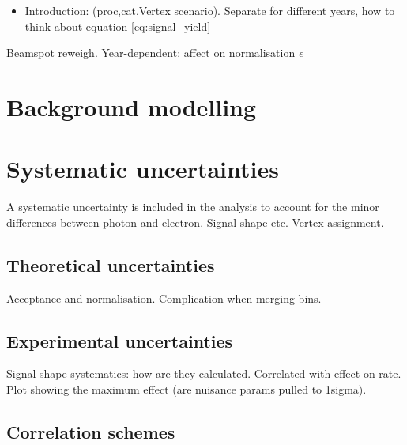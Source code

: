 \begin{itemize}
    \item Introduction: (proc,cat,Vertex scenario). Separate for different years, how to think about equation \ref{eq:signal_yield}
\end{itemize}


Beamspot reweigh. Year-dependent: affect on normalisation $\epsilon$

\section{Background modelling}\label{sec:bkg_modeling}

\section{Systematic uncertainties}\label{sec:systematics}
A systematic uncertainty is included in the analysis to account for the minor differences between photon and electron. Signal shape etc. Vertex assignment.
\subsection{Theoretical uncertainties}
Acceptance and normalisation. Complication when merging bins.

\subsection{Experimental uncertainties}
Signal shape systematics: how are they calculated. Correlated with effect on rate. Plot showing the maximum effect (are nuisance params pulled to 1sigma).


\subsection{Correlation schemes}